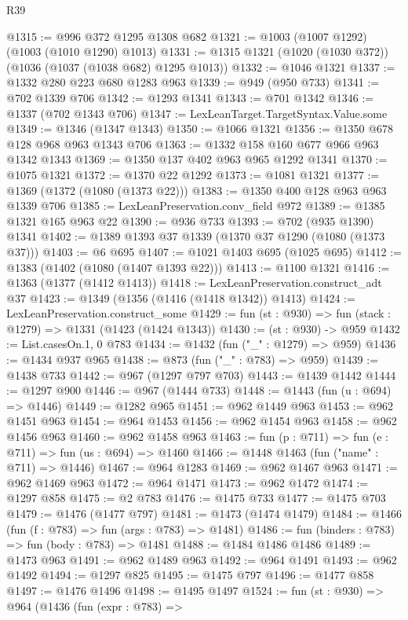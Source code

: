 \begin{lexlean}{R39}
\begin{coremodule}
@1315 := @996 @372 @1295 @1308 @682
@1321 := @1003 (@1007 @1292) (@1003 (@1010 @1290) @1013)
@1331 := @1315 @1321 (@1020 (@1030 @372)) (@1036 (@1037 (@1038 @682) @1295 @1013))
@1332 := @1046 @1321
@1337 := @1332 @280 @223 @680 @1283 @963
@1339 := @949 (@950 @733)
@1341 := @702 @1339 @706
@1342 := @1293 @1341
@1343 := @701 @1342
@1346 := @1337 (@702 @1343 @706)
@1347 := LexLeanTarget.TargetSyntax.Value.some
@1349 := @1346 (@1347 @1343)
@1350 := @1066 @1321
@1356 := @1350 @678 @128 @968 @963 @1343 @706
@1363 := @1332 @158 @160 @677 @966 @963 @1342 @1343
@1369 := @1350 @137 @402 @963 @965 @1292 @1341
@1370 := @1075 @1321
@1372 := @1370 @22 @1292
@1373 := @1081 @1321
@1377 := @1369 (@1372 (@1080 (@1373 @22)))
@1383 := @1350 @400 @128 @963 @963 @1339 @706
@1385 := LexLeanPreservation.conv_field @972
@1389 := @1385 @1321 @165 @963 @22
@1390 := @936 @733
@1393 := @702 (@935 @1390) @1341
@1402 := @1389 @1393 @37 @1339 (@1370 @37 @1290 (@1080 (@1373 @37)))
@1403 := @6 @695
@1407 := @1021 @1403 @695 (@1025 @695)
@1412 := @1383 (@1402 (@1080 (@1407 @1393 @22)))
@1413 := @1100 @1321
@1416 := @1363 (@1377 (@1412 @1413))
@1418 := LexLeanPreservation.construct_adt @37
@1423 := @1349 (@1356 (@1416 (@1418 @1342)) @1413)
@1424 := LexLeanPreservation.construct_some
@1429 := fun (st : @930) => fun (stack : @1279) => @1331 (@1423 (@1424 @1343))
@1430 := (st : @930) -> @959
@1432 := List.casesOn.{1, 0} @783
@1434 := @1432 (fun ("_" : @1279) => @959)
@1436 := @1434 @937 @965
@1438 := @873 (fun ("_" : @783) => @959)
@1439 := @1438 @733
@1442 := @967 (@1297 @797 @703)
@1443 := @1439 @1442
@1444 := @1297 @900
@1446 := @967 (@1444 @733)
@1448 := @1443 (fun (u : @694) => @1446)
@1449 := @1282 @965
@1451 := @962 @1449 @963
@1453 := @962 @1451 @963
@1454 := @964 @1453
@1456 := @962 @1454 @963
@1458 := @962 @1456 @963
@1460 := @962 @1458 @963
@1463 := fun (p : @711) => fun (e : @711) => fun (us : @694) => @1460
@1466 := @1448 @1463 (fun ("name" : @711) => @1446)
@1467 := @964 @1283
@1469 := @962 @1467 @963
@1471 := @962 @1469 @963
@1472 := @964 @1471
@1473 := @962 @1472
@1474 := @1297 @858
@1475 := @2 @783
@1476 := @1475 @733
@1477 := @1475 @703
@1479 := @1476 (@1477 @797)
@1481 := @1473 (@1474 @1479)
@1484 := @1466 (fun (f : @783) => fun (args : @783) => @1481)
@1486 := fun (binders : @783) => fun (body : @783) => @1481
@1488 := @1484 @1486 @1486
@1489 := @1473 @963
@1491 := @962 @1489 @963
@1492 := @964 @1491
@1493 := @962 @1492
@1494 := @1297 @825
@1495 := @1475 @797
@1496 := @1477 @858
@1497 := @1476 @1496
@1498 := @1495 @1497
@1524 := fun (st : @930) =>
  @964
    (@1436
      (fun (expr : @783) =>

\end{coremodule}
\end{lexlean}
